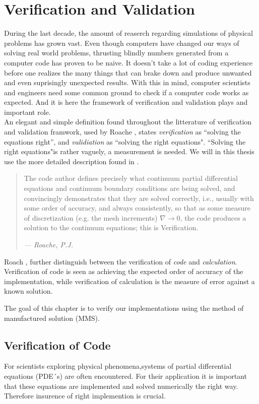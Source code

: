 \chapter{Verification and Validation}
During the last decade, the amount of reaserch regarding simulations of physical problems has grown vast. Even though computers have changed our ways of solving real world problems, thrusting blindly numbers generated from a computer code has proven to be naive. It doesn't take a lot of coding experience before one realizes the many things that can brake down and produce unwanted and even suprisingly unexpected results. 
With this in mind, computer scientists and engineers need some common ground to check if a computer code works as expected. And it is here the framework of verification and validation plays and important role. \\

 An elegant and simple definition found throughout the litterature of verification and validation framwork, used  by Roache \cite{Roache}, states \textit{verification} as ``solving the equations right'', and  \textit{validiation} as ``solving the right equations". ``Solving the right equations"is rather vaguely, a measurement is needed. We will in this thesis use the more detailed  description found in \cite{Roache}.

\begin{quote}
The code author defines precisely what continuum partial differential equations and continuum boundary conditions are being solved, and convincingly demonstrates that they are solved correctly, i.e., usually with some order of accuracy, and always consistently, so that as some measure of discretization (e.g. the mesh increments) $\nabla \rightarrow 0$, the code produces a solution to the continuum equations; this is Verification.
\begin{flushright}
\textit{--- Roache, P.J.}
\end{flushright}
\end{quote}
 

Roach \cite{Roache2002},  further distinguish between the verification of \textit{code} and \textit{calculation}. Verification of code is seen as achieving the expected order of accuracy of the implementation, while verification of calculation is the measure of error against a known solution.

The goal of this chapter is to verify our implementations using the method of manufactured solution  (MMS).

\section{Verification of Code}
For scientists exploring physical phenomena,systems of partial differential equations (PDE´s) are often encountered. For their application it is important that these equations are implemented and solved numerically the right way.  Therefore insurence of right implemention is crucial. \\

